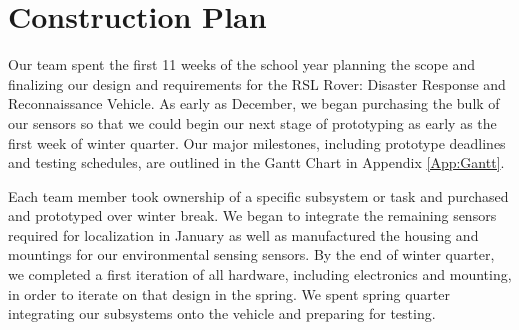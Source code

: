 \chapter{Construction Plan}

Our team spent the first 11 weeks of the school year planning the scope and finalizing our design and requirements for the RSL Rover: Disaster Response and Reconnaissance Vehicle. As early as December, we began purchasing the bulk of our sensors so that we could begin our next stage of prototyping as early as the first week of winter quarter. Our major milestones, including prototype deadlines and testing schedules, are outlined in the Gantt Chart in Appendix \ref{App:Gantt}. 

Each team member took ownership of a specific subsystem or task and purchased and prototyped over winter break. We began to integrate the remaining sensors required for localization in January as well as manufactured the housing and mountings for our environmental sensing sensors. By the end of winter quarter, we completed a first iteration of all hardware, including electronics and mounting, in order to iterate on that design in the spring. We spent spring quarter integrating our subsystems onto the vehicle and preparing for testing. 


